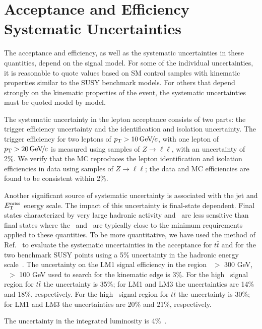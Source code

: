 \section{Acceptance and Efficiency Systematic Uncertainties}
\label{sec:systematics}

The acceptance and efficiency, as well as the systematic uncertainties in these quantities, 
depend on the signal model.
For some of the individual uncertainties, it is reasonable to quote values 
based on SM control samples with kinematic properties similar to the SUSY benchmark models. 
For others that depend strongly on the kinematic properties of the event, the systematic
uncertainties must be quoted model by model.

The systematic uncertainty in the lepton acceptance consists
of two parts: the trigger efficiency uncertainty and the 
identification and isolation uncertainty. The trigger efficiency 
for two leptons of $p_{\mathrm{T}}>10{\,\text{Ge\hspace{-.08em}V\hspace{-0.16em}/\hspace{-0.08em}}c}$, with one lepton of 
$p_{\mathrm{T}}>20{\,\text{Ge\hspace{-.08em}V\hspace{-0.16em}/\hspace{-0.08em}}c}$ is measured using samples of $Z \to \ell\ell$, 
with an uncertainty of 2\%. We verify that the MC reproduces the lepton identification and isolation efficiencies in data using
samples of $Z \to \ell\ell$; the data and MC efficiencies are found to be consistent within 2\%.

Another significant source of systematic uncertainty is 
associated with the jet and $E_{\mathrm{T}}^{\text{miss}}$ energy scale.  The impact
of this uncertainty is final-state dependent.  Final
states characterized by very large hadronic activity and \MET\ are 
less sensitive than final states where the \MET\ and \HT\ 
are typically close to the minimum requirements applied to these quantities.  To be more quantitative,
we have used the method of Ref.~\cite{ref:top} to evaluate
the systematic uncertainties in the acceptance for $t\bar{t}$ 
and for the two benchmark SUSY points using a 5\% uncertainty in the hadronic 
energy scale~\cite{ref:jes}.
The uncertainty on the LM1 signal efficiency in the region \Ht\ $>$ 300 GeV,
\MET\ $>$ 100 GeV used to search for the kinematic edge is 3\%.
For the high \MET\ signal region for $t\bar{t}$ the uncertainty is 35\%; for LM1 and LM3 the 
uncertainties are 14\% and 18\%, respectively.
For the high \Ht\ signal region for $t\bar{t}$ the uncertainty is 30\%; for LM1 and LM3 the 
uncertainties are 20\% and 21\%, respectively.

The uncertainty in the integrated luminosity is 4\%~\cite{ref:lumi}.
